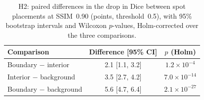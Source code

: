 \begin{table}[t]
  \caption{H2: paired differences in the drop in Dice between spot placements at SSIM~0.90 (points,
  threshold~0.5), with 95\% bootstrap intervals and Wilcoxon $p$-values, Holm-corrected over the three comparisons.}
  \label{tab:h2}
  \centering\small
  \begin{tabular}{lcc}
    \toprule
    Comparison & Difference [95\% CI] & $p$ (Holm) \\
    \midrule
    Boundary $-$ interior   & 2.1 [1.1, 3.2] & $1.2\times10^{-4}$ \\
    Interior $-$ background & 3.5 [2.7, 4.2] & $7.0\times10^{-14}$ \\
    Boundary $-$ background & 5.6 [4.7, 6.4] & $2.1\times10^{-27}$ \\
    \bottomrule
  \end{tabular}
\end{table}
